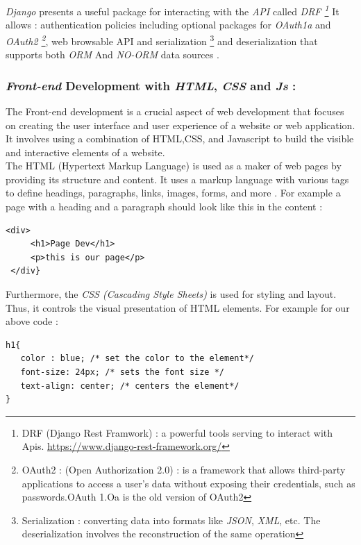 \documentclass[12pt,a4paper, oneside]{book}
\begin{document}
\textit{Django} presents a useful package for interacting with the \textit{API} called \textit{DRF \footnote{DRF (Django Rest Framwork) : a powerful tools serving to interact with Apis. \url{https://www.django-rest-framework.org/}}} It allows : authentication policies including optional packages for \textit{OAuth1a} and \textit{OAuth2 \footnote{OAuth2 :   (Open Authorization 2.0) : is a framework that allows third-party applications to access a user's data without exposing their credentials, such as passwords.OAuth 1.Oa is the old version of OAuth2  }}, web browsable API  and serialization \footnote{Serialization : converting data into formats like \textit{JSON}, \textit{XML}, etc. The deserialization involves the reconstruction of the same operation} and deserialization that supports both \textit{ORM} And \textit{NO-ORM} data sources \citep{nader2023django}. 
 
\subsubsection{\large \textit{Front-end} Development with \textit{HTML}, \textit{CSS} and \textit{Js} :} 
The Front-end development is a crucial aspect of web development that focuses on creating the user interface and user experience of a website or web application. It involves using a combination of HTML,CSS, and Javascript to build the visible and interactive elements of a website. \\

The HTML (Hypertext Markup Language) is used as a maker of web pages by providing its structure and content. It uses a markup language with various tags to define headings, paragraphs, links, images, forms, and more \citep{stark2010building}. For example a page with a heading and a paragraph should look like this in the content :
\begin{lstlisting}[style=htmlcssjsstyle]
 <div>
     <h1>Page Dev</h1>
     <p>this is our page</p>
 </div}
\end{lstlisting}

Furthermore, the \textit{CSS (Cascading Style Sheets)} is used for styling and layout. Thus, it controls the visual presentation of HTML elements. For example for our above code : \newline
\begin{lstlisting}[style=htmlcssjsstyle]
h1{
   color : blue; /* set the color to the element*/
   font-size: 24px; /* sets the font size */
   text-align: center; /* centers the element*/
}
\end{lstlisting} 
\end{document}

